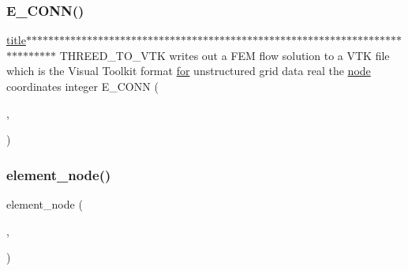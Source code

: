 \subsubsection{\texorpdfstring{E\+\_\+\+C\+O\+N\+N()}{E\_CONN()}}
{\footnotesize\ttfamily \hyperlink{a00617_a051e403214cb6872ad3fe4e50302a6ee}{title}$\ast$$\ast$$\ast$$\ast$$\ast$$\ast$$\ast$$\ast$$\ast$$\ast$$\ast$$\ast$$\ast$$\ast$$\ast$$\ast$$\ast$$\ast$$\ast$$\ast$$\ast$$\ast$$\ast$$\ast$$\ast$$\ast$$\ast$$\ast$$\ast$$\ast$$\ast$$\ast$$\ast$$\ast$$\ast$$\ast$$\ast$$\ast$$\ast$$\ast$$\ast$$\ast$$\ast$$\ast$$\ast$$\ast$$\ast$$\ast$$\ast$$\ast$$\ast$$\ast$$\ast$$\ast$$\ast$$\ast$$\ast$$\ast$$\ast$$\ast$$\ast$$\ast$$\ast$$\ast$$\ast$$\ast$$\ast$$\ast$$\ast$$\ast$$\ast$$\ast$$\ast$$\ast$$\ast$$\ast$$\ast$ T\+H\+R\+E\+E\+D\+\_\+\+T\+O\+\_\+\+V\+TK writes out a F\+EM flow solution to a V\+TK file which is the Visual Toolkit format \hyperlink{a00623_ad1e7380d51df1e0043d24d3c8a860e0a}{for} unstructured grid data real the \hyperlink{a00611_adf51fe9945b6ca147057cc27ff639d0f}{node} coordinates integer E\+\_\+\+C\+O\+NN (\begin{DoxyParamCaption}\item[{E\+L\+E\+M\+E\+N\+T\+\_\+\+N\+UM}]{,  }\item[{E\+L\+E\+M\+E\+N\+T\+\_\+\+O\+R\+D\+ER}]{ }\end{DoxyParamCaption})}

\mbox{\label{a00611_a50df015479692caa32ea5ed86939881e}} 
\subsubsection{\texorpdfstring{element\+\_\+node()}{element\_node()}}
{\footnotesize\ttfamily element\+\_\+node (\begin{DoxyParamCaption}\item[{1\+:\hyperlink{a00611_aa77ee84ffb15118601acbd018f243edc}{element\+\_\+order}}]{,  }\item[{1\+:element\+\_\+num}]{ }\end{DoxyParamCaption})}

\mbox{\label{a00611_a605afbf27a23b76ea451d4e10b41548b}} 
